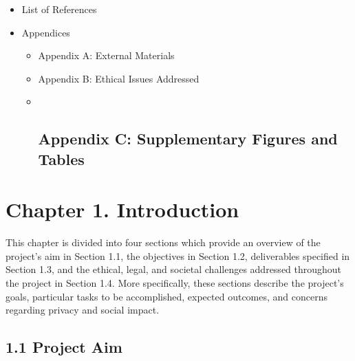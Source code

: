 \begin{itemize}
\begin{itemize}
    \begin{itemize}
    \tightlist
    \item
      6.2.1 Addressing Dataset Limitations and Temporal Drift
    \item
      6.2.2 Integrating Real-Time Atmospheric Indices
    \item
      6.2.3 Advanced Model Architectures and Multi-Task Learning
    \item
      6.2.4 Deployment Infrastructure and Edge Computing Integration
    \item
      6.2.5 Operator Decision-Support Interface and Threshold
      Optimisation
    \item
      6.2.6 Broader Research Trajectories
    \end{itemize}
  \end{itemize}
\item
  List of References
\item
  Appendices

  \begin{itemize}
  \item
    Appendix A: External Materials
  \item
    Appendix B: Ethical Issues Addressed
  \item ~
    \subsection{Appendix C: Supplementary Figures and
    Tables}\label{appendix-c-supplementary-figures-and-tables}
  \end{itemize}
\end{itemize}

\section{Chapter 1. Introduction}\label{chapter-1.-introduction}

This chapter is divided into four sections which provide an overview of
the project's aim in Section 1.1, the objectives in Section 1.2,
deliverables specified in Section 1.3, and the ethical, legal, and
societal challenges addressed throughout the project in Section 1.4.
More specifically, these sections describe the project's goals,
particular tasks to be accomplished, expected outcomes, and concerns
regarding privacy and social impact.

\subsection{1.1 Project Aim}\label{project-aim}

